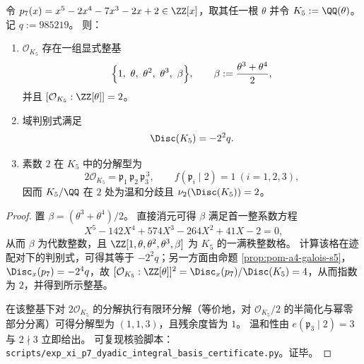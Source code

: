 \begin{theorem}\label{thm:xi-p7-k5-integral-basis-discriminant-dyadic-splitting}
令 \(p_7(x)=x^5-2x^4-7x^3-2x+2\in\ZZ[x]\)，取其任一根 \(\theta\) 并令
\(
K_{5}:=\QQ(\theta)
\)。
记
\(
q:=985219
\)。
则：
\begin{enumerate}
  \item \(\mathcal O_{K_5}\) 存在一组显式整基
  \[
  \Bigl\{1,\ \theta,\ \theta^2,\ \theta^3,\ \beta\Bigr\},\qquad
  \beta:=\frac{\theta^3+\theta^4}{2},
  \]
  并且 \([\mathcal O_{K_5}:\ZZ[\theta]]=2\)。
  \item 域判别式满足
  \[
  \Disc(K_5)=-2^{2}q.
  \]
  \item 素数 \(2\) 在 \(K_5\) 中的分解型为
  \[
  2\mathcal O_{K_5}=\mathfrak p_1\,\mathfrak p_2\,\mathfrak p_3^{\,3},
  \qquad
  f(\mathfrak p_i\mid 2)=1\ (i=1,2,3),
  \]
  因而 \(K_5/\QQ\) 在 \(2\) 处为温和分歧且 \(\nu_2(\Disc(K_5))=2\)。
\end{enumerate}
\end{theorem}
\begin{proof}
置 \(\beta=(\theta^3+\theta^4)/2\)。
直接消元可得 \(\beta\) 满足首一整系数方程
\[
X^{5}-142X^{4}+574X^{3}-264X^{2}+41X-2=0,
\]
从而 \(\beta\) 为代数整数，且
\(
\ZZ[1,\theta,\theta^2,\theta^3,\beta]
\)
为 \(K_5\) 的一满秩整数格。
计算该格在迹配对下的判别式，可得其等于 \(-2^2q\)；另一方面由命题 \ref{prop:pom-a4-galois-s5}，\(\Disc_x(p_7)=-2^4q\)，故
\(
[\mathcal O_{K_5}:\ZZ[\theta]]^2=\Disc_x(p_7)/\Disc(K_5)=4
\)，从而指数为 \(2\)，并得到所示整基。
\par
在该整基下对 \(2\mathcal O_{K_5}\) 的分解执行有限环分解（等价地，对 \(\mathcal O_{K_5}/2\) 的半简化与幂零部分分离）可得分解型为 \((1,1,3)\)，且残余度皆为 \(1\)。
温和性由 \(e(\mathfrak p_3\mid 2)=3\) 与 \(2\nmid 3\) 立即给出。
可复现核验脚本：\texttt{scripts/exp\_xi\_p7\_dyadic\_integral\_basis\_certificate.py}。证毕。
\end{proof}

